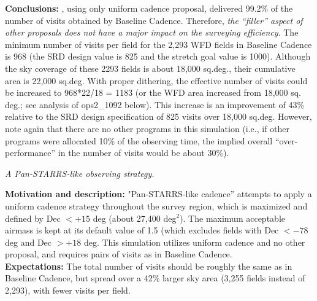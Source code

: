 {\bf Conclusions:} , using only uniform cadence
proposal, delivered 99.2\% of the number of visits obtained by
Baseline Cadence. Therefore, {\it the ``filler'' aspect of other
proposals does not have a major impact on the surveying efficiency}.
The minimum number of visits per field for the 2,293 WFD fields in
Baseline Cadence is 968 (the SRD design value is 825 and the stretch
goal value is 1000). Although the sky coverage of these 2293 fields is
about 18,000 sq.deg., their cumulative area is 22,000 sq.deg. With
proper dithering, the effective number of visits could be increased to
968*22/18 = 1183 (or the WFD area increased from 18,000 sq. deg.; see
analysis of ops2\_1092 below). This increase is an improvement of 43\%
relative to the SRD design specification of 825 visits over 18,000
sq.deg. However, note again that there are no other programs in this
simulation (i.e., if other programs were allocated 10\% of the
observing time, the implied overall ``over-performance'' in the number
of  visits would be about 30\%).



{\it A Pan-STARRS-like observing strategy.}

{\bf Motivation and description:} "Pan-STARRS-like cadence” attempts
to apply a uniform cadence strategy throughout the survey region,
which is maximized and defined by Dec $< +15$ deg (about 27,400
deg$^2$). The maximum acceptable airmass is kept at its default value
of 1.5 (which excludes fields with Dec $< -78$ deg and Dec $> +18$
deg. This simulation utilizes uniform cadence and no other proposal,
and requires pairs of visits as in Baseline Cadence. \\

{\bf Expectations:} The total number of visits should be roughly the
same as in Baseline Cadence, but spread over a 42\% larger sky area
(3,255 fields instead of 2,293), with fewer visits per field. \\


